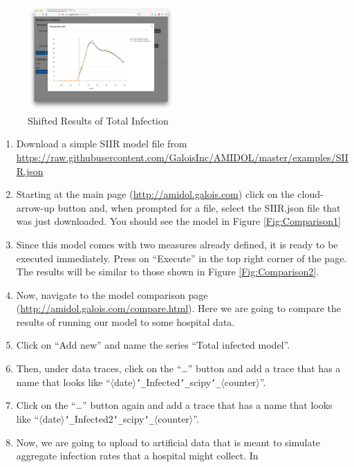\documentclass[12pt]{galois-whitepaper}
\renewcommand{\textunderscore}{\texttt{\char`_}}
\begin{document}
\begin{figure}
  \centering
  \includegraphics[width=0.5\textwidth]{figs/comparision-ui-6.png}
  \caption{Shifted Results of Total Infection}
  \label{Fig:Comparison6}
\end{figure}

\begin{enumerate}
\item Download a simple SIIR model  file from
  \url{https://raw.githubusercontent.com/GaloisInc/AMIDOL/master/examples/SIIR.json}
\item Starting at the main page (\url{http://amidol.galois.com}) click
  on the cloud-arrow-up button and, when prompted for a file, select
  the SIIR.json file that was just downloaded.  You should see the
  model in Figure \ref{Fig:Comparison1}
\item Since this model comes with two measures already defined, it is
  ready to be executed immediately. Press on “Execute” in the top
  right corner of the page.  The results will be similar to those
  shown in Figure \ref{Fig:Comparison2}.
\item Now, navigate to the model comparison page
  (\url{http://amidol.galois.com/compare.html}). Here we are going to
  compare the results of running our model to some hospital data.
\item Click on “Add new” and name the series “Total infected model”.
\item Then, under data traces,  click on the “…” button and add a
  trace that has a name that looks like
  “$\langle$date$\rangle$\textunderscore{}Infected\textunderscore{}scipy\textunderscore{}$\langle$counter$\rangle$”.
\item Click on the “…” button again and add a trace that has a name
  that looks like “$\langle$date$\rangle$\textunderscore{}Infected2\textunderscore{}scipy\textunderscore{}$\langle$counter$\rangle$”.
\item Now, we are going to upload to artificial data that is meant to
  simulate aggregate infection rates that a hospital might collect. In

\end{enumerate}
\end{document}
